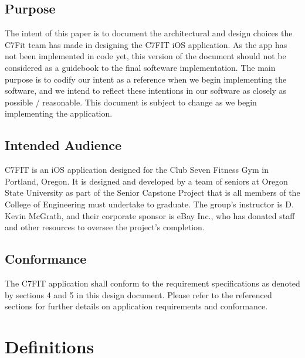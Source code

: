 \documentclass[letterpaper,10pt,titlepage]{article}
\begin{document}
\subsection{Purpose}
The intent of this paper is to document the architectural and design choices the C7Fit team has made in designing the C7FIT iOS application. As the app has not been implemented in code  yet, this version of the document should not be considered as a guidebook to the final softeware implementation. The main purpose is to codify our intent as a reference when we begin implementing the software, and we intend to reflect these intentions in our software as closely as possible / reasonable. This document is subject to change as we begin implementing the application.

\subsection{Intended Audience}
C7FIT is an iOS application designed for the Club Seven Fitness Gym in Portland, Oregon. It is designed and developed by a team of seniors at Oregon State University as part of the Senior Capstone Project that is all members of the College of Engineering must undertake to graduate. The group's instructor is D. Kevin McGrath, and their corporate sponsor is eBay Inc., who has donated staff and other resources to oversee the project's completion.

\subsection{Conformance}
The C7FIT application shall conform to the requirement specifications as denoted by sections 4 and 5 in this design document. Please refer to the referenced sections for further details on application requirements and conformance.

\section{Definitions}
\end{document}
